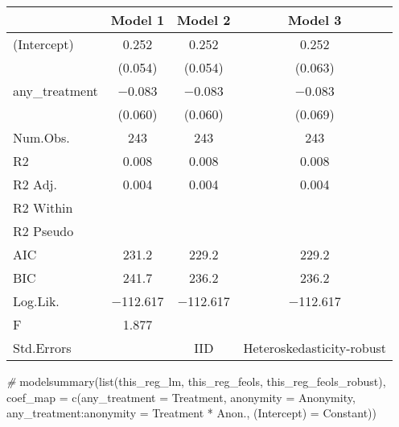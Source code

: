 \documentclass[
]{article}
\newenvironment{Shaded}{\begin{snugshade}}{\end{snugshade}}
\newcommand{\AttributeTok}[1]{\textcolor[rgb]{0.77,0.63,0.00}{#1}}
\newcommand{\CommentTok}[1]{\textcolor[rgb]{0.56,0.35,0.01}{\textit{#1}}}
\newcommand{\FunctionTok}[1]{\textcolor[rgb]{0.00,0.00,0.00}{#1}}
\newcommand{\NormalTok}[1]{#1}
\newcommand{\OtherTok}[1]{\textcolor[rgb]{0.56,0.35,0.01}{#1}}
\newcommand{\StringTok}[1]{\textcolor[rgb]{0.31,0.60,0.02}{#1}}
\begin{document}
\begin{table}
\centering
\begin{tabular}[t]{lccc}
\toprule
  & Model 1 & Model 2 & Model 3\\
\midrule
(Intercept) & \num{0.252} & \num{0.252} & \num{0.252}\\
 & (\num{0.054}) & (\num{0.054}) & (\num{0.063})\\
any\_treatment & \num{-0.083} & \num{-0.083} & \num{-0.083}\\
 & (\num{0.060}) & (\num{0.060}) & (\num{0.069})\\
\midrule
Num.Obs. & \num{243} & \num{243} & \num{243}\\
R2 & \num{0.008} & \num{0.008} & \num{0.008}\\
R2 Adj. & \num{0.004} & \num{0.004} & \num{0.004}\\
R2 Within &  &  & \\
R2 Pseudo &  &  & \\
AIC & \num{231.2} & \num{229.2} & \num{229.2}\\
BIC & \num{241.7} & \num{236.2} & \num{236.2}\\
Log.Lik. & \num{-112.617} & \num{-112.617} & \num{-112.617}\\
F & \num{1.877} &  & \\
Std.Errors &  & IID & Heteroskedasticity-robust\\
\bottomrule
\end{tabular}
\end{table}

\begin{Shaded}
\begin{Highlighting}[]
\CommentTok{\# }
\FunctionTok{modelsummary}\NormalTok{(}\FunctionTok{list}\NormalTok{(this\_reg\_lm, this\_reg\_feols, this\_reg\_feols\_robust), }
             \AttributeTok{coef\_map =} \FunctionTok{c}\NormalTok{(}\StringTok{\textquotesingle{}any\_treatment\textquotesingle{}} \OtherTok{=} \StringTok{\textquotesingle{}Treatment\textquotesingle{}}\NormalTok{,}
                \StringTok{\textquotesingle{}anonymity\textquotesingle{}} \OtherTok{=} \StringTok{\textquotesingle{}Anonymity\textquotesingle{}}\NormalTok{,}
                \StringTok{\textquotesingle{}any\_treatment:anonymity\textquotesingle{}} \OtherTok{=} \StringTok{\textquotesingle{}Treatment * Anon.\textquotesingle{}}\NormalTok{,}
                \StringTok{\textquotesingle{}(Intercept)\textquotesingle{}} \OtherTok{=} \StringTok{\textquotesingle{}Constant\textquotesingle{}}\NormalTok{))}
\end{Highlighting}
\end{Shaded}
\end{document}
